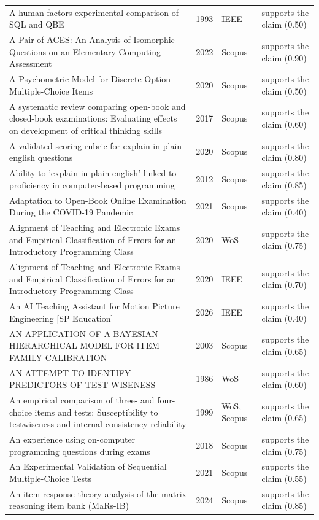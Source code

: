 \begin{longtable}{@{}%
  >{\raggedright\arraybackslash}p{}c%
  >{\raggedright\arraybackslash}p{}%
  >{\raggedright\arraybackslash}p{}@{}}
A human factors experimental comparison of SQL and QBE & 1993 & IEEE & supports the claim (0.50) \\
A Pair of ACES: An Analysis of Isomorphic Questions on an Elementary Computing Assessment & 2022 & Scopus & supports the claim (0.90) \\
A Psychometric Model for Discrete-Option Multiple-Choice Items & 2020 & Scopus & supports the claim (0.50) \\
A systematic review comparing open-book and closed-book examinations: Evaluating effects on development of critical thinking skills & 2017 & Scopus & supports the claim (0.60) \\
A validated scoring rubric for explain-in-plain-english questions & 2020 & Scopus & supports the claim (0.80) \\
Ability to 'explain in plain english' linked to proficiency in computer-based programming & 2012 & Scopus & supports the claim (0.85) \\
Adaptation to Open-Book Online Examination During the COVID-19 Pandemic & 2021 & Scopus & supports the claim (0.40) \\
Alignment of Teaching and Electronic Exams and Empirical Classification of Errors for an Introductory Programming Class & 2020 & WoS & supports the claim (0.75) \\
Alignment of Teaching and Electronic Exams and Empirical Classification of Errors for an Introductory Programming Class & 2020 & IEEE & supports the claim (0.70) \\
An AI Teaching Assistant for Motion Picture Engineering [SP Education] & 2026 & IEEE & supports the claim (0.40) \\
AN APPLICATION OF A BAYESIAN HIERARCHICAL MODEL FOR ITEM FAMILY CALIBRATION & 2003 & Scopus & supports the claim (0.65) \\
AN ATTEMPT TO IDENTIFY PREDICTORS OF TEST-WISENESS & 1986 & WoS & supports the claim (0.60) \\
An empirical comparison of three- and four-choice items and tests: Susceptibility to testwiseness and internal consistency reliability & 1999 & WoS, Scopus & supports the claim (0.65) \\
An experience using on-computer programming questions during exams & 2018 & Scopus & supports the claim (0.75) \\
An Experimental Validation of Sequential Multiple-Choice Tests & 2021 & Scopus & supports the claim (0.55) \\
An item response theory analysis of the matrix reasoning item bank (MaRs-IB) & 2024 & Scopus & supports the claim (0.85) \\

\end{longtable}
